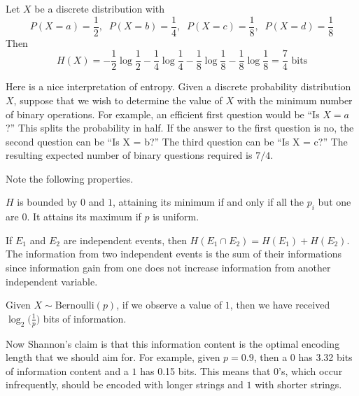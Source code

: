 \documentclass{article}
\begin{document}
    \begin{example}
      Let $X$ be a discrete distribution with
      \begin{equation}
        P(X = a) = \frac{1}{2}, \;\; P(X = b) = \frac{1}{4}, \;\; P(X = c) = \frac{1}{8}, \;\; P(X = d) = \frac{1}{8}
      \end{equation}
      Then 
      \begin{equation}
        H(X) = -\frac{1}{2} \log \frac{1}{2} -\frac{1}{4} \log \frac{1}{4} -\frac{1}{8} \log \frac{1}{8} -\frac{1}{8} \log \frac{1}{8} = \frac{7}{4} \text{ bits}
      \end{equation}
    \end{example}

    Here is a nice interpretation of entropy. Given a discrete probability distribution $X$, suppose that we wish to determine the value of $X$ with the minimum number of binary operations. For example, an efficient first question would be “Is $X = a$?” This splits the probability in half. If the answer to the first question is no, the second question can be “Is X = b?” The third question can be “Is X = c?” The resulting expected number of binary questions required is $7/4$. 

    Note the following properties. 

    \begin{theorem}
      $H$ is bounded by $0$ and $1$, attaining its minimum if and only if all the $p_i$ but one are $0$. It attains its maximum if $p$ is uniform. 
    \end{theorem}

    \begin{theorem}
      If $E_1$ and $E_2$ are independent events, then $H(E_1 \cap E_2) = H(E_1) + H(E_2)$. The information from two independent events is the sum of their informations since information gain from one does not increase information from another independent variable.  
    \end{theorem}

    \begin{example}[Bits]
      Given $X \sim \mathrm{Bernoulli}(p)$, if we observe a value of $1$, then we have received $\log_2 \big( \frac{1}{p} \big)$ bits of information. 
    \end{example}

    Now Shannon's claim is that this information content is the optimal encoding length that we should aim for. For example, given $p = 0.9$, then a $0$ has 3.32 bits of information content and a $1$ has 0.15 bits. This means that $0$'s, which occur infrequently, should be encoded with longer strings and $1$ with shorter strings.   
\end{document}
